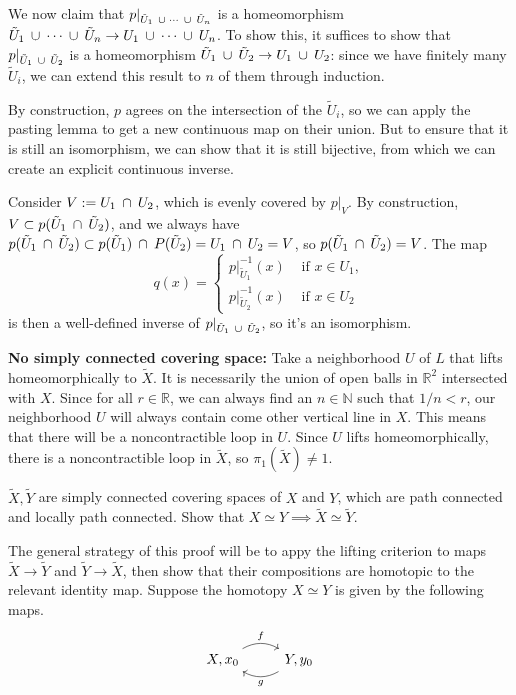 \documentclass[twoside,10pt]{article}
\begin{document}
We now claim that $p|_{\tilde{U}_1 \operatorname{\;\cup\;} \cdots \operatorname{\;\cup\;} \tilde{U}_n}$ is a homeomorphism $\tilde{U}_1 \operatorname{\;\cup\;} \cdots \operatorname{\;\cup\;} \tilde{U}_n \to U_1\operatorname{\;\cup\;}\cdots\operatorname{\;\cup\;} U_n$. To show this, it suffices to show that $p|_{\tilde{U}_1 \operatorname{\;\cup\;} \tilde{U}_2}$ is a homeomorphism $\tilde{U}_1 \operatorname{\;\cup\;} \tilde{U}_2 \to U_1\operatorname{\;\cup\;} U_2$: since we have finitely many $\tilde{U}_i$, we can extend this result to $n$ of them through induction.

By construction, $p$ agrees on the intersection of the $\tilde{U}_i$, so we can apply the pasting lemma to get a new continuous map on their union. But to ensure that it is still an isomorphism, we can show that it is still bijective, from which we can create an explicit continuous inverse.

Consider $V := U_1 \operatorname{\;\cap\;} U_2$, which is evenly covered by $p|_{V}$. By construction, $V \subset p(\tilde{U}_1\operatorname{\;\cap\;}\tilde{U}_2)$, and we always have $p(\tilde{U}_1 \operatorname{\;\cap\;} \tilde{U}_2) \subset p(\tilde{U}_1) \operatorname{\;\cap\;} P(\tilde{U}_2) = U_1 \operatorname{\;\cap\;} U_2 = V$, so $p(\tilde{U}_1 \operatorname{\;\cap\;} \tilde{U}_2)=V$. The map
\[
	q(x) = 
	\begin{cases}
		p|_{\tilde{U}_1}^{-1}(x) & \text{ if } x \in U_1,\\
		p|_{\tilde{U}_2}^{-1}(x) & \text{ if } x \in U_2
	\end{cases}
\] is then a well-defined inverse of $p|_{\tilde{U}_1 \operatorname{\;\cup\;} \tilde{U}_2}$, so it's an isomorphism.

\textbf{No simply connected covering space:} Take a neighborhood $U$ of $L$ that lifts homeomorphically to $\tilde{X}$. It is necessarily the union of open balls in $\mathbb{R}^{2}$ intersected with $X$. Since for all $r \in \mathbb{R}$, we can always find an $n \in \mathbb{N}$ such that $1/n < r$, our neighborhood $U$ will always contain come other vertical line in $X$. This means that there will be a noncontractible loop in $U$. Since $U$ lifts homeomorphically, there is a noncontractible loop in $\tilde{X}$, so $\pi_1(\tilde{X}) \neq 1$.

\newpage

\begin{exer}[1.3: 8]
$\tilde{X},\tilde{Y}$ are simply connected covering spaces of $X$ and $Y$, which are path connected and locally path connected. Show that $X \simeq Y \implies \tilde{X} \simeq \tilde{Y}$.
\end{exer}

The general strategy of this proof will be to appy the lifting criterion to maps $\tilde{X}\to \tilde{Y}$ and $\tilde{Y}\to \tilde{X}$, then show that their compositions are homotopic to the relevant identity map. Suppose the homotopy $X \simeq Y$ is given by the following maps.
\[
\begin{tikzcd}
	X,x_0 \rar[bend left]{f} & Y,y_0 \lar[bend left]{g}
\end{tikzcd}
\] 
\end{document}
